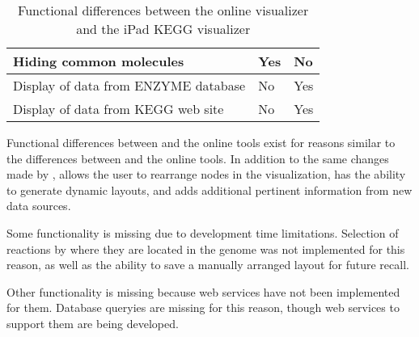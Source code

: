 \begin{table}[ht!]
\begin{tabular}{ | p{2.75in} | p{1.25in} | p{1.25in} | }
    Hiding common molecules
                        & Yes       & No \\ \hline

    Display of data from ENZYME database
                        & No        & Yes \\ \hline

    Display of data from KEGG web site
                        & No        & Yes \\ \hline
\end{tabular}
    \caption{Functional differences between the online \pathcasekegg visualizer
    and the iPad KEGG visualizer}
    \label{fig:kegg_comparison_table}
\end{table}

Functional differences between \keggapp and the online \pathcasekegg tools exist
for reasons similar to the differences between \mawapp and the \pathcasemaw
online tools. In addition to the same changes made by \mawapp, \keggapp allows
the user to rearrange nodes in the visualization, has the ability to generate
dynamic layouts, and adds additional pertinent information from new data
sources.

Some functionality is missing due to development time limitations. Selection of
reactions by where they are located in the genome was not implemented for this
reason, as well as the ability to save a manually arranged layout for future
recall.

Other functionality is missing because web services have not been implemented
for them. Database queryies are missing for this reason, though web services to
support them are being developed.
